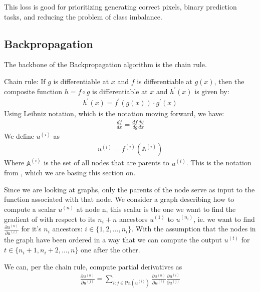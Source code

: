 \documentclass[a4paper,12pt]{article}
\begin{document}
This loss is good for prioritizing generating correct pixels, binary prediction tasks, and reducing the problem of class imbalance.




\subsection{Backpropagation}
The backbone of the Backpropagation algorithm is the chain rule.




Chain rule: If $g$ is differentiable at $x$ and $f$ is differentiable at $g(x)$, then the composite function $h=f \circ g$ is differentiable at $x$ and $h^\prime(x)$ is given by:
\begin{align}
h^\prime(x)=f^\prime(g(x))\cdot g^\prime(x)
\end{align}
Using Leibniz notation, which is the notation moving forward, we have:
\begin{align}
\frac{d f}{d x} = \frac{d f}{d g } \frac{d g}{d x}
\end{align}
We define $u^{(i)}$ as
\begin{align}
u^{(i)} = f^{(i)}(\mathbb{A}^{(i)})
\end{align}
Where $\mathbb{A}^{(i)}$ is the set of all nodes that are parents to $u^{(i)}$. This is the notation from \cite{Goodfellow-et-al-2016}, which we are basing this section on.




Since we are looking at graphs, only the parents of the node serve as input to the function associated with that node.
We consider a graph describing how to compute a scalar $u^{(n)}$ at node n, this scalar is the one we want to find the gradient of with respect to its $n_i+n$ ancestors $u^{(1)}$ to $u^{(n_i)}$, ie. we want to find $\frac{\partial u^{(n)}}{\partial u^{(i)}}$ for it's $n_i$ ancestors: $i \in \{1,2,\dots, n_i\}$.
With the assumption that the nodes in the graph have been ordered in a way that we can compute the output $u^{(t)}$ for $t \in \{n_i+1, n_i+2,\dots, n\}$ one after the other.




We can, per the chain rule, compute partial derivatives as
\begin{align}
\frac{\partial u^{(n)}}{\partial u^{(j)}} = \sum_{i : j \in \text{Pa}(u^{(i)})} \frac{\partial u^{(n)}}{\partial u^{(i)}} \frac{\partial u^{(i)}}{\partial u^{(j)}}
\end{align}
\end{document}
